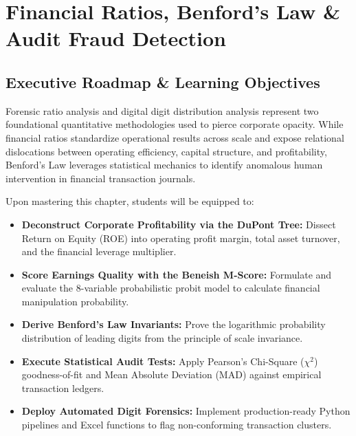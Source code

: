 \chapter{Financial Ratios, Benford's Law \& Audit Fraud Detection}

\section{Executive Roadmap \& Learning Objectives}

Forensic ratio analysis and digital digit distribution analysis represent two foundational quantitative methodologies used to pierce corporate opacity. While financial ratios standardize operational results across scale and expose relational dislocations between operating efficiency, capital structure, and profitability, Benford's Law leverages statistical mechanics to identify anomalous human intervention in financial transaction journals.

\begin{tcolorbox}[colback=primarylight, colframe=primarydark, title={\textbf{Core Learning Competencies}}]
Upon mastering this chapter, students will be equipped to:
\begin{itemize}
    \item \textbf{Deconstruct Corporate Profitability via the DuPont Tree:} Dissect Return on Equity (ROE) into operating profit margin, total asset turnover, and the financial leverage multiplier.
    \item \textbf{Score Earnings Quality with the Beneish M-Score:} Formulate and evaluate the 8-variable probabilistic probit model to calculate financial manipulation probability.
    \item \textbf{Derive Benford's Law Invariants:} Prove the logarithmic probability distribution of leading digits from the principle of scale invariance.
    \item \textbf{Execute Statistical Audit Tests:} Apply Pearson's Chi-Square ($\chi^2$) goodness-of-fit and Mean Absolute Deviation (MAD) against empirical transaction ledgers.
    \item \textbf{Deploy Automated Digit Forensics:} Implement production-ready Python pipelines and Excel functions to flag non-conforming transaction clusters.
\end{itemize}
\end{tcolorbox}

